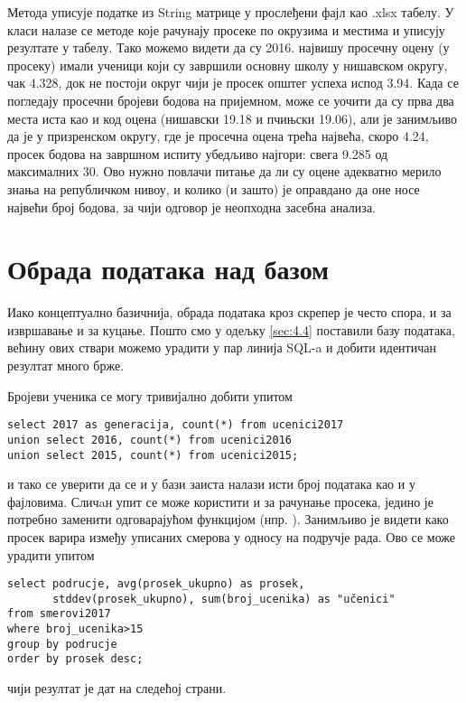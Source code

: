 Метода  уписује податке из String матрице у прослеђени фајл као .xlsx табелу. У класи  налазе се методе које рачунају просеке по окрузима и местима и уписују резултате у табелу. Тако можемо видети да су 2016. највишу просечну оцену (у просеку) имали ученици који су завршили основну школу у нишавском округу, чак 4.328, док не постоји округ чији је просек општег успеха испод 3.94. Када се погледају просечни бројеви бодова на пријемном, може се уочити да су прва два места иста као и код оцена (нишавски 19.18 и пчињски 19.06), али је занимљиво да је у призренском округу, где је просечна оцена трећа највећа, скоро 4.24, просек бодова на завршном испиту убедљиво најгори: свега 9.285 од максималних 30. Ово нужно повлачи питање да ли су оцене адекватно мерило знања на републичком нивоу, и колико (и зашто) је оправдано да оне носе највећи број бодова, за чији одговор је неопходна засебна анализа.

\section{Обрада података над базом}\label{ch:obradasql}

Иако концептуално базичнија, обрада података кроз скрепер је често спора, и за извршавање и за куцање. Пошто смо у одељку \ref{sec:4.4} поставили базу података, већину ових ствари можемо урадити у пар линија SQL-a и добити идентичан резултат много брже.

Бројеви ученика се могу тривијално добити упитом 
\begin{verbatim}
select 2017 as generacija, count(*) from ucenici2017 
union select 2016, count(*) from ucenici2016 
union select 2015, count(*) from ucenici2015;
\end{verbatim} 
и тако се уверити да се и у бази заиста налази исти број података као и у фајловима. Сличaн упит се може користити и за рачунање просека, једино је потребно заменити  одговарајућом функцијом (нпр. ). Занимљиво је видети како просек варира између уписаних смерова у односу на подручје рада. Ово се може урадити упитом
\begin{verbatim}
select podrucje, avg(prosek_ukupno) as prosek, 
       stddev(prosek_ukupno), sum(broj_ucenika) as "učenici"
from smerovi2017 
where broj_ucenika>15 
group by podrucje 
order by prosek desc;
\end{verbatim}
чији резултат је дат на следећој страни.

